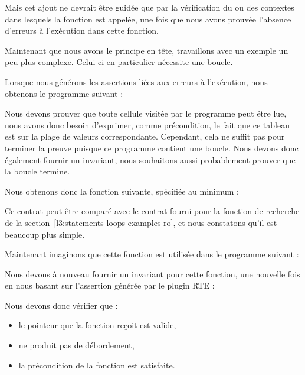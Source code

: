 

Mais cet ajout ne devrait être guidée que par la vérification du ou des
contextes dans lesquels la fonction est appelée, une fois que nous avons
prouvée l'absence d'erreurs à l'exécution dans cette fonction.




Maintenant que nous avons le principe en tête, travaillons avec un exemple un peu
plus complexe. Celui-ci en particulier nécessite une boucle.




Lorsque nous générons les assertions liées aux erreurs à l'exécution, nous
obtenons le programme suivant :




Nous devons prouver que toute cellule visitée par le programme peut être lue,
nous avons donc besoin d'exprimer, comme précondition, le fait que ce tableau est
 sur la plage de valeurs correspondante.
Cependant, cela ne suffit pas pour terminer la preuve puisque ce programme
contient une boucle. Nous devons donc également fournir un invariant, nous
souhaitons aussi probablement prouver que la boucle termine.


Nous obtenons donc la fonction suivante, spécifiée au minimum :





Ce contrat peut être comparé avec le contrat fourni pour la fonction de recherche
de la section~\ref{l3:statements-loops-examples-ro}, et nous constatons qu'il est
beaucoup plus simple.


Maintenant imaginons que cette fonction est utilisée dans le programme suivant :




Nous devons à nouveau fournir un invariant pour cette fonction, une nouvelle fois
en nous basant sur l'assertion générée par le plugin RTE :




Nous devons donc vérifier que :
\begin{itemize}
\item le pointeur que la fonction reçoit est valide,
\item {} ne produit pas de débordement,
\item la précondition de la fonction  est satisfaite.
\end{itemize}


